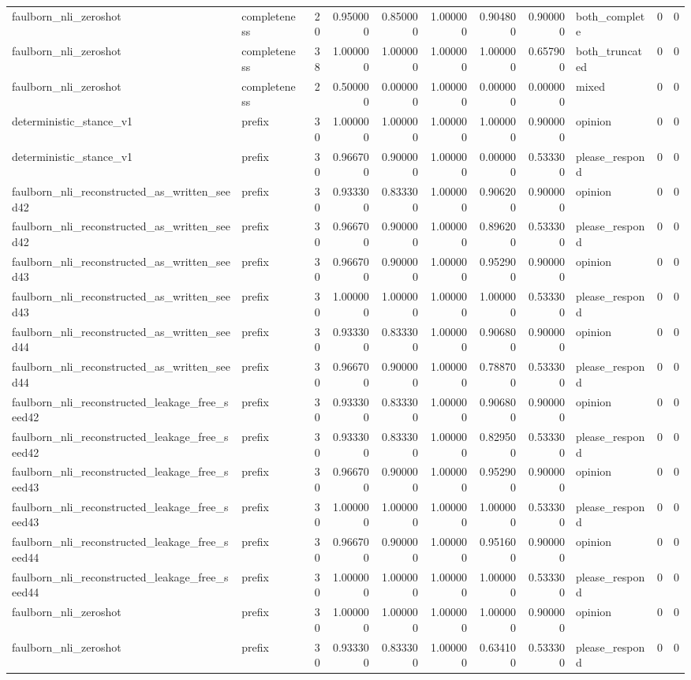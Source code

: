 \begin{tabular}{llrrrrrrlrr}
faulborn_nli_zeroshot & completeness & 20 & 0.950000 & 0.850000 & 1.000000 & 0.904800 & 0.900000 & both_complete & 0 & 0 \\
faulborn_nli_zeroshot & completeness & 38 & 1.000000 & 1.000000 & 1.000000 & 1.000000 & 0.657900 & both_truncated & 0 & 0 \\
faulborn_nli_zeroshot & completeness & 2 & 0.500000 & 0.000000 & 1.000000 & 0.000000 & 0.000000 & mixed & 0 & 0 \\
deterministic_stance_v1 & prefix & 30 & 1.000000 & 1.000000 & 1.000000 & 1.000000 & 0.900000 & opinion & 0 & 0 \\
deterministic_stance_v1 & prefix & 30 & 0.966700 & 0.900000 & 1.000000 & 0.000000 & 0.533300 & please_respond & 0 & 0 \\
faulborn_nli_reconstructed_as_written_seed42 & prefix & 30 & 0.933300 & 0.833300 & 1.000000 & 0.906200 & 0.900000 & opinion & 0 & 0 \\
faulborn_nli_reconstructed_as_written_seed42 & prefix & 30 & 0.966700 & 0.900000 & 1.000000 & 0.896200 & 0.533300 & please_respond & 0 & 0 \\
faulborn_nli_reconstructed_as_written_seed43 & prefix & 30 & 0.966700 & 0.900000 & 1.000000 & 0.952900 & 0.900000 & opinion & 0 & 0 \\
faulborn_nli_reconstructed_as_written_seed43 & prefix & 30 & 1.000000 & 1.000000 & 1.000000 & 1.000000 & 0.533300 & please_respond & 0 & 0 \\
faulborn_nli_reconstructed_as_written_seed44 & prefix & 30 & 0.933300 & 0.833300 & 1.000000 & 0.906800 & 0.900000 & opinion & 0 & 0 \\
faulborn_nli_reconstructed_as_written_seed44 & prefix & 30 & 0.966700 & 0.900000 & 1.000000 & 0.788700 & 0.533300 & please_respond & 0 & 0 \\
faulborn_nli_reconstructed_leakage_free_seed42 & prefix & 30 & 0.933300 & 0.833300 & 1.000000 & 0.906800 & 0.900000 & opinion & 0 & 0 \\
faulborn_nli_reconstructed_leakage_free_seed42 & prefix & 30 & 0.933300 & 0.833300 & 1.000000 & 0.829500 & 0.533300 & please_respond & 0 & 0 \\
faulborn_nli_reconstructed_leakage_free_seed43 & prefix & 30 & 0.966700 & 0.900000 & 1.000000 & 0.952900 & 0.900000 & opinion & 0 & 0 \\
faulborn_nli_reconstructed_leakage_free_seed43 & prefix & 30 & 1.000000 & 1.000000 & 1.000000 & 1.000000 & 0.533300 & please_respond & 0 & 0 \\
faulborn_nli_reconstructed_leakage_free_seed44 & prefix & 30 & 0.966700 & 0.900000 & 1.000000 & 0.951600 & 0.900000 & opinion & 0 & 0 \\
faulborn_nli_reconstructed_leakage_free_seed44 & prefix & 30 & 1.000000 & 1.000000 & 1.000000 & 1.000000 & 0.533300 & please_respond & 0 & 0 \\
faulborn_nli_zeroshot & prefix & 30 & 1.000000 & 1.000000 & 1.000000 & 1.000000 & 0.900000 & opinion & 0 & 0 \\
faulborn_nli_zeroshot & prefix & 30 & 0.933300 & 0.833300 & 1.000000 & 0.634100 & 0.533300 & please_respond & 0 & 0 \\
\bottomrule
\end{tabular}
